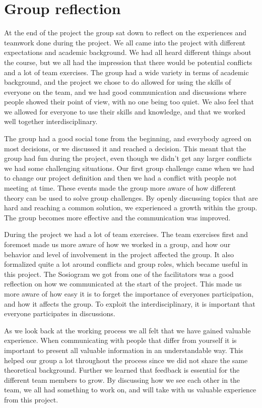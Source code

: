 \chapter{Group reflection}
\label{chap:reflection}
%
At the end of the project the group sat down to reflect on the experiences and teamwork done during the project. We all came into the project with different expectations and academic background. We had all heard different things about the course, but we all had the impression that there would be potential conflicts and a lot of team exercises. The group had a wide variety in terms of academic background, and the project we chose to do allowed for using the skills of everyone on the team, and we had good communication and discussions where people showed their point of view, with no one being too quiet. We also feel that we allowed for everyone to use their skills and knowledge, and that we worked well together interdisciplinary.

The group had a good social tone from the beginning, and everybody agreed on most decisions, or we discussed it and reached a decision. This meant that the group had fun during the project, even though we didn't get any larger conflicts we had some challenging situations. Our first group challenge came when we had to change our project definition and then we had a conflict with people not meeting at time. These events made the group more aware of how different theory can be used to solve group challenges. By openly discussing topics that are hard and reaching a common solution, we experienced a growth within the group. The group becomes more effective and the communication was improved.

During the project we had a lot of team exercises. The team exercises first and foremost made us more aware of how we worked in a group, and how our behavior and level of involvement in the project affected the group. It also formalized quite a lot around conflicts and group roles, which became useful in this project. The Sosiogram we got from one of the facilitators was a good reflection on how we communicated at the start of the project. This made us more aware of how easy it is to forget the importance of everyones participation, and how it affects the group. To exploit the interdisciplinary, it is important that everyone participates in discussions. 

As we look back at the working process we all felt that we have gained valuable experience. When communicating with people that differ from yourself it is important to present all valuable information in an understandable way. This helped our group a lot throughout the process since we did not share the same theoretical background. Further we learned that feedback is essential for the different team members to grow. By discussing how we see each other in the team, we all had something to work on, and will take with us valuable experience from this project.  
